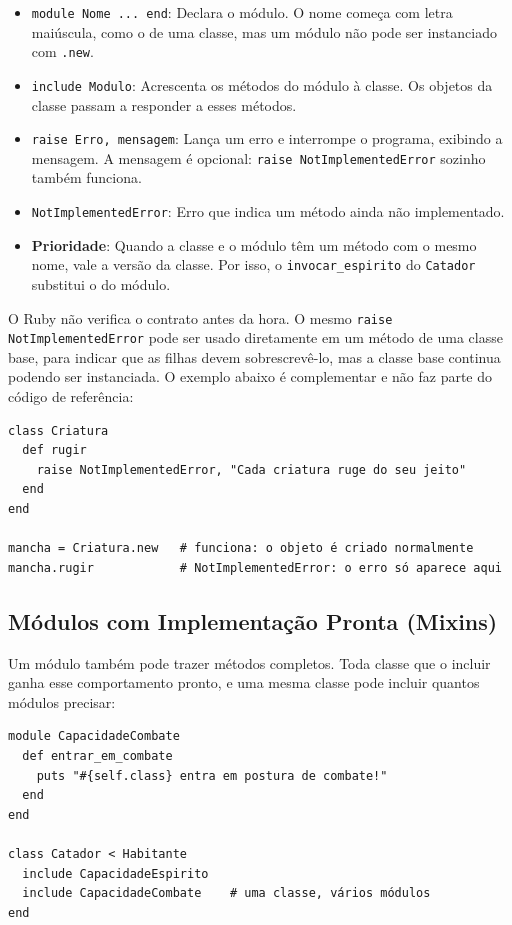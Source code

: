 \begin{itemize}
    \item \texttt{module Nome ... end}: Declara o módulo. O nome começa com letra maiúscula,
    como o de uma classe, mas um módulo não pode ser instanciado com \texttt{.new}.

    \item \texttt{include Modulo}: Acrescenta os métodos do módulo à classe. Os objetos da
    classe passam a responder a esses métodos.

    \item \texttt{raise Erro, mensagem}: Lança um erro e interrompe o programa, exibindo a
    mensagem. A mensagem é opcional: \texttt{raise NotImplementedError} sozinho também funciona.

    \item \texttt{NotImplementedError}: Erro que indica um método ainda não implementado.

    \item \textbf{Prioridade}: Quando a classe e o módulo têm um método com o mesmo nome, vale a
    versão da classe. Por isso, o \texttt{invocar\_espirito} do \texttt{Catador} substitui o do
    módulo.
\end{itemize}

O Ruby não verifica o contrato antes da hora. O mesmo \texttt{raise NotImplementedError} pode
ser usado diretamente em um método de uma classe base, para indicar que as filhas devem
sobrescrevê-lo, mas a classe base continua podendo ser instanciada. O exemplo abaixo é
complementar e não faz parte do código de referência:

\begin{lstlisting}[style=ruby]
class Criatura
  def rugir
    raise NotImplementedError, "Cada criatura ruge do seu jeito"
  end
end

mancha = Criatura.new   # funciona: o objeto é criado normalmente
mancha.rugir            # NotImplementedError: o erro só aparece aqui
\end{lstlisting}

\subsection{Módulos com Implementação Pronta (Mixins)}

Um módulo também pode trazer métodos completos. Toda classe que o incluir ganha esse
comportamento pronto, e uma mesma classe pode incluir quantos módulos precisar:

\begin{lstlisting}[style=ruby]
module CapacidadeCombate
  def entrar_em_combate
    puts "#{self.class} entra em postura de combate!"
  end
end

class Catador < Habitante
  include CapacidadeEspirito
  include CapacidadeCombate    # uma classe, vários módulos
end
\end{lstlisting}

